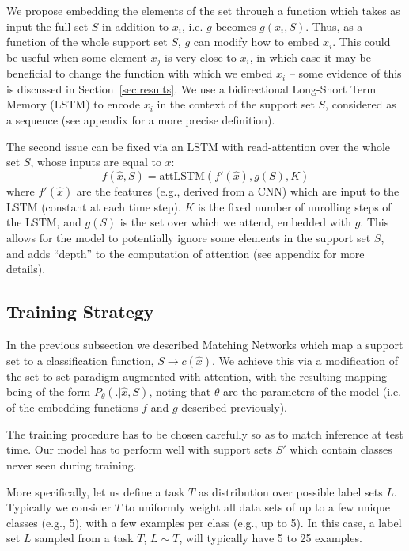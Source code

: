 We propose embedding the elements of the set through a function which takes as input the full set $S$ in addition to $x_i$, i.e. $g$ becomes $g(x_i, S)$. Thus, as a function of the whole support set $S$, $g$ can modify how to embed $x_i$. This could be useful when some element $x_j$ is very close to $x_i$, in which case it may be beneficial to change the function with which we embed $x_i$ -- some evidence of this is discussed in Section~\ref{sec:results}.
We use a bidirectional Long-Short Term Memory (LSTM) \cite{hochreiter} to encode $x_i$ in the context of the support set $S$, considered as a sequence (see appendix for a more precise definition). 

The second issue can be fixed via an LSTM with read-attention over the whole set $S$, whose inputs are equal to $x$:
\begin{equation*}
f(\hat{x},S) = \text{attLSTM}(f'(\hat{x}), g(S), K)
\end{equation*}
where $f'(\hat{x})$ are the features (e.g., derived from a CNN) which are input to the LSTM (constant at each time step). $K$ is the fixed number of unrolling steps of the LSTM, and $g(S)$ is the set over which we attend, embedded with $g$. This allows for the model to potentially ignore some elements in the support set $S$, and adds ``depth'' to the computation of attention (see appendix for more details).

\subsection{Training Strategy}

In the previous subsection we described Matching Networks which map a support set to a classification function, $S \rightarrow c(\hat{x})$. We achieve this via a modification of the set-to-set paradigm augmented with attention, with the resulting mapping being of the form $P_\theta(.|\hat{x},S)$, noting that $\theta$ are the parameters of the model (i.e. of the embedding functions $f$ and $g$ described previously).

The training procedure has to be chosen carefully so as to match inference at test time. Our model has to perform well with support sets $S'$ which contain classes never seen during training.

More specifically, let us define a task $T$ as distribution over possible label sets $L$. Typically we consider $T$ to uniformly weight all data sets of up to a few unique classes (e.g., 5), with a few examples per class (e.g., up to 5).
In this case, a label set $L$ sampled from a task $T$,  $L \sim T$, will typically have 5 to 25 examples.

